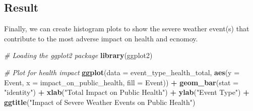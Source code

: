 \documentclass[
]{article}
\newenvironment{Shaded}{\begin{snugshade}}{\end{snugshade}}
\newcommand{\CommentTok}[1]{\textcolor[rgb]{0.56,0.35,0.01}{\textit{#1}}}
\newcommand{\DataTypeTok}[1]{\textcolor[rgb]{0.13,0.29,0.53}{#1}}
\newcommand{\KeywordTok}[1]{\textcolor[rgb]{0.13,0.29,0.53}{\textbf{#1}}}
\newcommand{\NormalTok}[1]{#1}
\newcommand{\OperatorTok}[1]{\textcolor[rgb]{0.81,0.36,0.00}{\textbf{#1}}}
\newcommand{\OtherTok}[1]{\textcolor[rgb]{0.56,0.35,0.01}{#1}}
\newcommand{\StringTok}[1]{\textcolor[rgb]{0.31,0.60,0.02}{#1}}
\begin{document}
\begin{Shaded}
\end{Shaded}

\hypertarget{result}{%
\subsection{Result}\label{result}}

Finally, we can create histogram plots to show the severe weather
event(s) that contribute to the most adverse impact on health and
ecnomoy.

\begin{Shaded}
\begin{Highlighting}[]
\CommentTok{# Loading the ggplot2 package}
\KeywordTok{library}\NormalTok{(ggplot2)}

\CommentTok{# Plot for health impact}
\KeywordTok{ggplot}\NormalTok{(}\DataTypeTok{data =}\NormalTok{ event_type_health_total, }\KeywordTok{aes}\NormalTok{(}\DataTypeTok{y =}\NormalTok{ Event, }\DataTypeTok{x =}\NormalTok{ impact_on_public_health, }\DataTypeTok{fill =}\NormalTok{ Event)) }\OperatorTok{+}\StringTok{ }\KeywordTok{geom_bar}\NormalTok{(}\DataTypeTok{stat =} \StringTok{"identity"}\NormalTok{) }\OperatorTok{+}\StringTok{ }\KeywordTok{xlab}\NormalTok{(}\StringTok{"Total Impact on Public Health"}\NormalTok{) }\OperatorTok{+}\StringTok{ }\KeywordTok{ylab}\NormalTok{(}\StringTok{"Event Type"}\NormalTok{) }\OperatorTok{+}\StringTok{ }\KeywordTok{ggtitle}\NormalTok{(}\StringTok{"Impact of Severe Weather Events on Public Health"}\NormalTok{)}
\end{Highlighting}
\end{Shaded}
\end{document}
